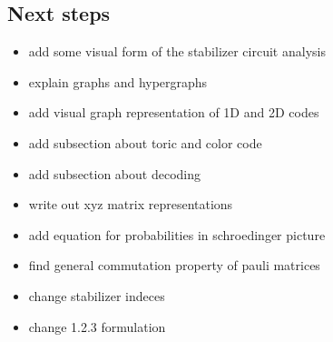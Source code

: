 \subsection{Next steps}
\begin{itemize}
    \item add some visual form of the stabilizer circuit analysis
    \item explain graphs and hypergraphs
    \item add visual graph representation of 1D and 2D codes
    \item add subsection about toric and color code
    \item add subsection about decoding 
    \item write out xyz matrix representations
    \item add equation for probabilities in schroedinger picture
    \item find general commutation property of pauli matrices
    \item change stabilizer indeces
    \item change 1.2.3 formulation
\end{itemize}